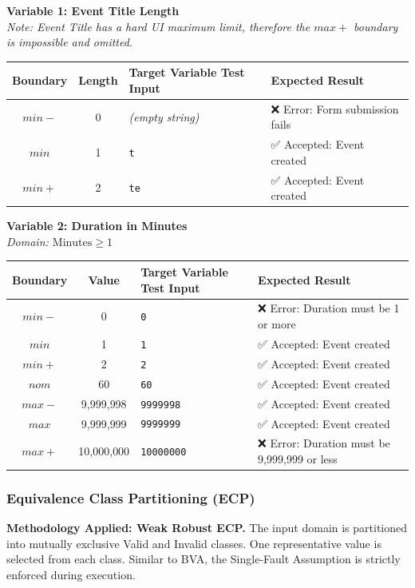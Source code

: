 \documentclass[twoside,final]{hcmut-report}
\begin{document}
\vspace{0.3cm}
\noindent\textbf{Variable 1: Event Title Length} \\
\textit{Note: Event Title has a hard UI maximum limit, therefore the $max+$ boundary is impossible and omitted.}
\begin{table}[H]
\centering
\renewcommand{\arraystretch}{1.2}
\begin{tabularx}{\textwidth}{|c|c|l|X|}
\hline
\textbf{Boundary} & \textbf{Length} & \textbf{Target Variable Test Input} & \textbf{Expected Result} \\ \hline
$min-$ & 0 & \textit{(empty string)} & ❌ Error: Form submission fails \\ \hline
$min$ & 1 & \texttt{t} & ✅ Accepted: Event created \\ \hline
$min+$ & 2 & \texttt{te} & ✅ Accepted: Event created \\ \hline
\end{tabularx}
\end{table}

\vspace{0.3cm}
\noindent\textbf{Variable 2: Duration in Minutes} \\
\textit{Domain: $\text{Minutes} \ge 1$}
\begin{table}[H]
\centering
\renewcommand{\arraystretch}{1.2}
\begin{tabularx}{\textwidth}{|c|c|l|X|}
\hline
\textbf{Boundary} & \textbf{Value} & \textbf{Target Variable Test Input} & \textbf{Expected Result} \\ \hline
$min-$ & 0 & \texttt{0} & ❌ Error: Duration must be 1 or more \\ \hline
$min$ & 1 & \texttt{1} & ✅ Accepted: Event created \\ \hline
$min+$ & 2 & \texttt{2} & ✅ Accepted: Event created \\ \hline
$nom$ & 60 & \texttt{60} & ✅ Accepted: Event created \\ \hline
$max-$ & 9{,}999{,}998 & \texttt{9999998} & ✅ Accepted: Event created \\ \hline
$max$ & 9{,}999{,}999 & \texttt{9999999} & ✅ Accepted: Event created \\ \hline
$max+$ & 10{,}000{,}000 & \texttt{10000000} & ❌ Error: Duration must be 9{,}999{,}999 or less \\ \hline
\end{tabularx}
\end{table}

\subsubsection{Equivalence Class Partitioning (ECP)}
\textbf{Methodology Applied: Weak Robust ECP.}
The input domain is partitioned into mutually exclusive Valid and Invalid classes. One representative value is selected from each class. Similar to BVA, the Single-Fault Assumption is strictly enforced during execution.
\end{document}
